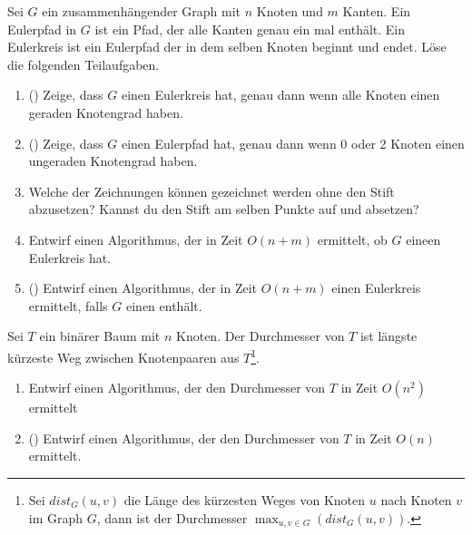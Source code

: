 \documentclass{uebung_cs}
\begin{document}
\begin{aufgabe}
	Sei $G$ ein zusammenhängender Graph mit $n$ Knoten und $m$ Kanten.
	Ein Eulerpfad in $G$ ist ein Pfad, der alle Kanten genau ein mal enthält.
	Ein Eulerkreis ist ein Eulerpfad der in dem selben Knoten beginnt und endet.
	Löse die folgenden Teilaufgaben.
	\begin{enumerate}
		\item (\hard) Zeige, dass $G$ einen Eulerkreis hat, genau dann wenn alle Knoten einen geraden Knotengrad haben.
		\item (\hard) Zeige, dass $G$ einen Eulerpfad hat, genau dann wenn 0 oder 2 Knoten einen ungeraden Knotengrad haben.
		\item Welche der Zeichnungen können gezeichnet werden ohne den Stift abzusetzen?
		Kannst du den Stift am selben Punkte auf und absetzen?\\
		\begin{center}
			\hspace{1.5cm}
			\hspace{1.5cm}
		\end{center}
		\item Entwirf einen Algorithmus, der in Zeit $O(n+m)$ ermittelt, ob $G$ eineen Eulerkreis hat.
		\item (\hard) Entwirf einen Algorithmus, der in Zeit $O(n+m)$ einen Eulerkreis ermittelt, falls $G$ einen enthält.
	\end{enumerate}	
\end{aufgabe}

\begin{aufgabe}
	Sei $T$ ein binärer Baum mit $n$ Knoten.
	Der Durchmesser von $T$ ist längste kürzeste Weg zwischen Knotenpaaren aus $T$\footnote{Sei $dist_G(u,v)$ die Länge des kürzesten Weges von Knoten $u$ nach Knoten $v$ im Graph $G$, dann ist der Durchmesser $\max_{u,v\in G}( dist_G(u,v) )$.}.
	\begin{enumerate}
		\item Entwirf einen Algorithmus, der den Durchmesser von $T$ in Zeit $O(n^2)$ ermittelt
		\item (\hard) Entwirf einen Algorithmus, der den Durchmesser von $T$ in Zeit $O(n)$ ermittelt.
	\end{enumerate}
\end{aufgabe}
\end{document}

